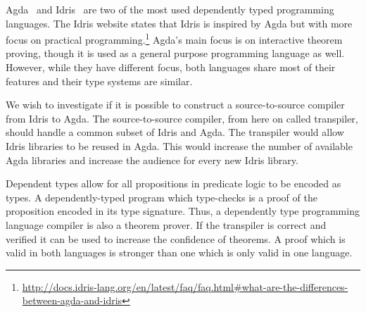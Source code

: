
Agda~\cite{agda} and Idris~\cite{idris} are two of the most used dependently
typed programming languages.
The Idris website states that Idris is inspired
by Agda but with more focus on practical
programming.\footnote{\url{http://docs.idris-lang.org/en/latest/faq/faq.html\#what-are-the-differences-between-agda-and-idris}}
Agda's main focus is on interactive theorem proving, though it is used as
a general purpose programming language as well.  However, while they have
different focus, both languages share most of their features and their type
systems are similar.

We wish to investigate if it is possible to construct a source-to-source
compiler from Idris to Agda. The source-to-source compiler, from here on called
transpiler,  should handle a common subset of Idris and Agda.  The transpiler
would allow Idris libraries to be reused in Agda. This would increase the
number of available Agda libraries and increase the audience for every new
Idris library.

Dependent types allow for all propositions in  predicate logic to be encoded as
types. A dependently-typed program which type-checks is a proof of the proposition encoded in
its type signature. Thus, a dependently type programming language compiler is also a theorem
prover.  If the transpiler is correct and verified it can be used to increase
the confidence of theorems. A proof which is valid in both languages is
stronger than one which is only valid in one language. 


